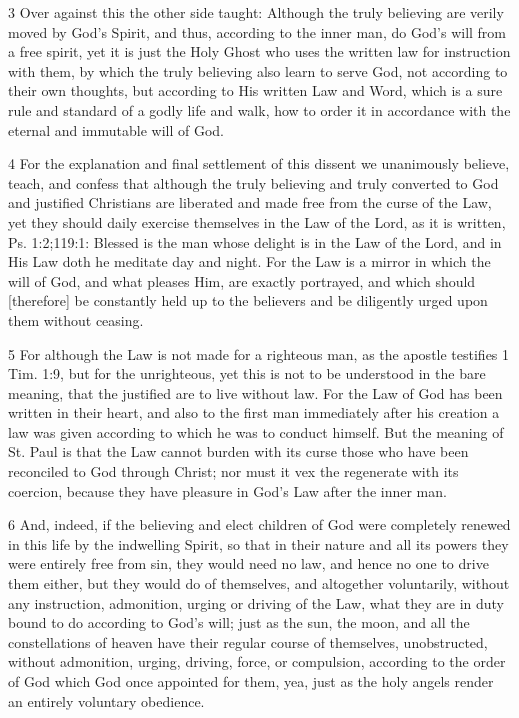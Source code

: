 3 Over against this the other side taught: Although the truly believing are verily moved by God’s Spirit, and thus, according to the inner man, do God’s will from a free spirit, yet it is just the Holy Ghost who uses the written law for instruction with them, by which the truly believing also learn to serve God, not according to their own thoughts, but according to His written Law and Word, which is a sure rule and standard of a godly life and walk, how to order it in accordance with the eternal and immutable will of God.

4 For the explanation and final settlement of this dissent we unanimously believe, teach, and confess that although the truly believing and truly converted to God and justified Christians are liberated and made free from the curse of the Law, yet they should daily exercise themselves in the Law of the Lord, as it is written, Ps. 1:2;119:1: Blessed is the man whose delight is in the Law of the Lord, and in His Law doth he meditate day and night. For the Law is a mirror in which the will of God, and what pleases Him, are exactly portrayed, and which should [therefore] be constantly held up to the believers and be diligently urged upon them without ceasing.

5 For although the Law is not made for a righteous man, as the apostle testifies 1 Tim. 1:9, but for the unrighteous, yet this is not to be understood in the bare meaning, that the justified are to live without law. For the Law of God has been written in their heart, and also to the first man immediately after his creation a law was given according to which he was to conduct himself. But the meaning of St. Paul is that the Law cannot burden with its curse those who have been reconciled to God through Christ; nor must it vex the regenerate with its coercion, because they have pleasure in God’s Law after the inner man.

6 And, indeed, if the believing and elect children of God were completely renewed in this life by the indwelling Spirit, so that in their nature and all its powers they were entirely free from sin, they would need no law, and hence no one to drive them either, but they would do of themselves, and altogether voluntarily, without any instruction, admonition, urging or driving of the Law, what they are in duty bound to do according to God’s will; just as the sun, the moon, and all the constellations of heaven have their regular course of themselves, unobstructed, without admonition, urging, driving, force, or compulsion, according to the order of God which God once appointed for them, yea, just as the holy angels render an entirely voluntary obedience.


